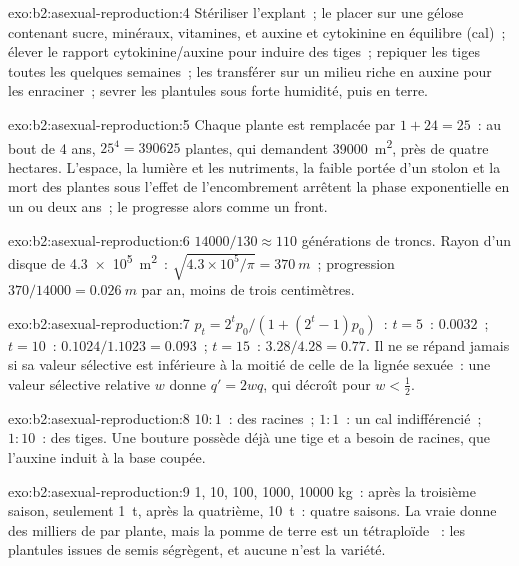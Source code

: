 \begin{solution}{exo:b2:asexual-reproduction:4}
Stériliser l'explant~; le placer sur une gélose contenant sucre,
minéraux, vitamines, et auxine et cytokinine en équilibre (cal)~;
élever le rapport cytokinine/auxine pour induire des tiges~; repiquer les
tiges toutes les quelques semaines~; les transférer sur un milieu riche
en auxine pour les enraciner~; sevrer les plantules sous forte humidité,
puis en terre.
\end{solution}

\begin{solution}{exo:b2:asexual-reproduction:5}
Chaque plante est remplacée par $1 + 24 = 25$~: au bout de 4 ans,
$25^{4} =
\num{390625}$ plantes, qui demandent \qty{39000}{m^2}, près de quatre
hectares. L'espace, la lumière et les nutriments, la faible portée d'un
stolon et la mort des plantes sous l'effet de l'encombrement arrêtent la
phase exponentielle en un ou deux ans~; le  progresse alors comme
un front.
\end{solution}

\begin{solution}{exo:b2:asexual-reproduction:6}
$\num{14000}/130 \approx 110$ générations de troncs. Rayon d'un disque
de \qty{4.3e5}{m^2}~: $\sqrt{4.3\times 10^{5}/\pi} = \qty{370}{m}$~;
progression $370/\num{14000} = \qty{0.026}{m}$ par an, moins de trois
centimètres.
\end{solution}

\begin{solution}{exo:b2:asexual-reproduction:7}
$p_t = 2^{t}p_0/(1 + (2^{t} - 1)p_0)$~: $t = 5$~: $0.0032$~; $t = 10$~:
$0.1024/1.1023 = 0.093$~; $t = 15$~: $3.28/4.28 = 0.77$. Il ne se répand
jamais si sa valeur sélective est inférieure à la moitié de celle de la
lignée sexuée~: une valeur sélective relative $w$ donne $q' = 2wq$, qui
décroît pour $w <
\tfrac12$.
\end{solution}

\begin{solution}{exo:b2:asexual-reproduction:8}
$10 : 1$~: des racines~; $1 : 1$~: un cal indifférencié~; $1 : 10$~: des
tiges. Une bouture possède déjà une tige et a besoin de racines, que
l'auxine induit à la base coupée.
\end{solution}

\begin{solution}{exo:b2:asexual-reproduction:9}
1, 10, 100, \num{1000}, \num{10000} kg~: après la troisième saison,
seulement \qty{1}{t}, après la quatrième, \qty{10}{t}~: quatre saisons.
La vraie  donne des milliers de  par plante, mais la pomme
de terre est un tétraploïde ~: les plantules issues de
semis ségrègent, et aucune n'est la variété.
\end{solution}

